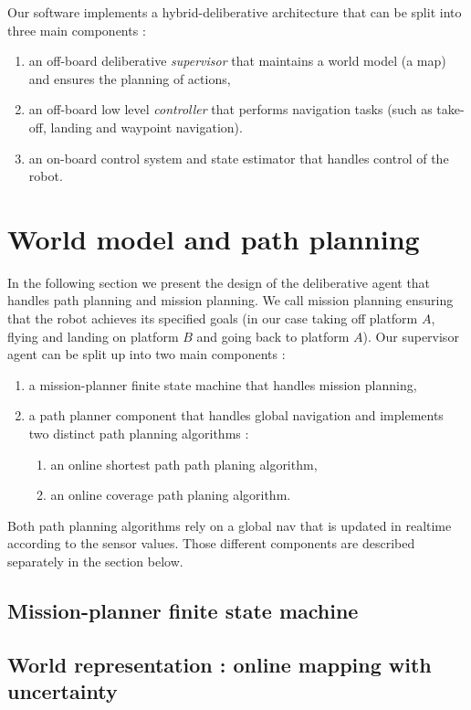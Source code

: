 \documentclass[11pt]{article}
\begin{document}
Our software implements a hybrid-deliberative architecture that can be split into three main components :
\begin{enumerate}
    \item an off-board deliberative \textit{supervisor} that maintains a world model (a map) and ensures the planning of actions,
    \item an off-board low level \textit{controller} that performs navigation tasks (such as take-off, landing and waypoint navigation).
    \item an on-board control system and state estimator that handles control of the robot.
\end{enumerate}


\section{World model and path planning}

In the following section we present the design of the deliberative agent that handles path planning and mission planning. We call mission planning ensuring that the robot achieves its specified goals (in our case taking off platform $A$, flying and landing on platform $B$ and going back to platform $A$). Our supervisor agent can be split up into two main components : 
\begin{enumerate}
    \item a mission-planner finite state machine that handles mission planning,
    \item a path planner component that handles global navigation and implements two distinct path planning algorithms : 
    \begin{enumerate}
        \item an online shortest path path planing algorithm,
        \item an online coverage path planing algorithm.
    \end{enumerate}
\end{enumerate}

Both path planning algorithms rely on a global nav that is updated in realtime according to the sensor values. Those different components are described separately in the section below.


\subsection{Mission-planner finite state machine}

\subsection{World representation : online mapping with uncertainty}
\end{document}
